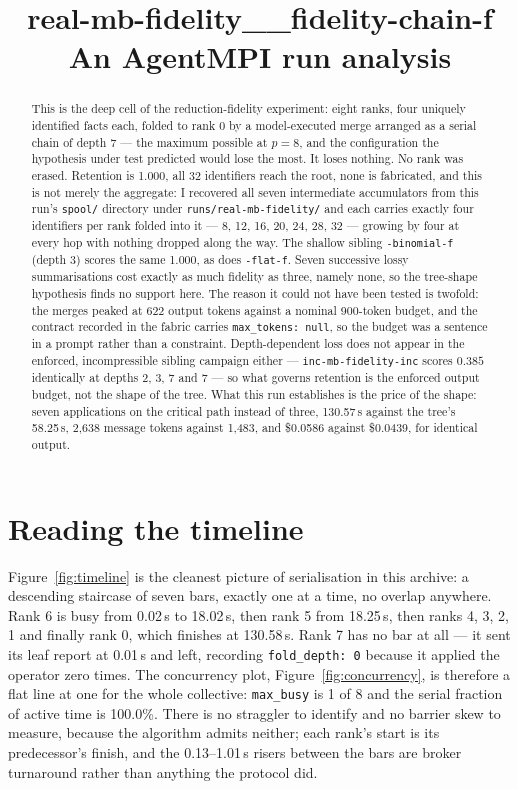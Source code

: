 \documentclass[11pt]{article}
\title{\textbf{real-mb-fidelity\_\_fidelity-chain-f}\\[2pt]\large An AgentMPI run analysis}
\author{}
\date{}
\begin{document}
\maketitle

\begin{abstract}
This is the deep cell of the reduction-fidelity experiment: eight ranks, four uniquely
identified facts each, folded to rank 0 by a model-executed merge arranged as a serial
chain of depth 7 --- the maximum possible at $p = 8$, and the configuration the
hypothesis under test predicted would lose the most. It loses nothing. No rank was
erased. Retention is 1.000, all 32 identifiers reach the root, none is fabricated, and
this is not merely the aggregate: I recovered all seven intermediate accumulators from
this run's \texttt{spool/} directory under \texttt{runs/real-mb-fidelity/} and each carries exactly four
identifiers per rank folded into it --- 8, 12, 16, 20, 24, 28, 32 --- growing by four at
every hop with nothing dropped along the way. The shallow sibling
\texttt{-binomial-f} (depth 3) scores the same 1.000, as does \texttt{-flat-f}. Seven
successive lossy summarisations cost exactly as much fidelity as three, namely none, so
the tree-shape hypothesis finds no support here. The reason it could not have been
tested is twofold: the merges peaked at 622 output tokens against a nominal 900-token
budget, and the contract recorded in the fabric carries \texttt{max\_tokens: null}, so
the budget was a sentence in a prompt rather than a constraint. Depth-dependent loss
does not appear in the enforced, incompressible sibling campaign either --- 
\texttt{inc-mb-fidelity-inc} scores $0.385$ identically at depths 2, 3, 7 and 7 --- so
what governs retention is the enforced output budget, not the shape of the tree. What
this run establishes is the price of the shape: seven applications on the critical path
instead of three, 130.57\,s against the tree's 58.25\,s, 2{,}638 message tokens against
1{,}483, and \$0.0586 against \$0.0439, for identical output.
\end{abstract}



\section{Reading the timeline}

Figure~\ref{fig:timeline} is the cleanest picture of serialisation in this archive: a
descending staircase of seven bars, exactly one at a time, no overlap anywhere. Rank 6
is busy from 0.02\,s to 18.02\,s, then rank 5 from 18.25\,s, then ranks 4, 3, 2, 1 and
finally rank 0, which finishes at 130.58\,s. Rank 7 has no bar at all --- it sent its
leaf report at 0.01\,s and left, recording \texttt{fold\_depth: 0} because it applied
the operator zero times. The concurrency plot, Figure~\ref{fig:concurrency}, is
therefore a flat line at one for the whole collective: \texttt{max\_busy} is 1 of 8 and
the serial fraction of active time is 100.0\%. There is no straggler to identify and no
barrier skew to measure, because the algorithm admits neither; each rank's start is its
predecessor's finish, and the 0.13--1.01\,s risers between the bars are broker
turnaround rather than anything the protocol did.
\end{document}
